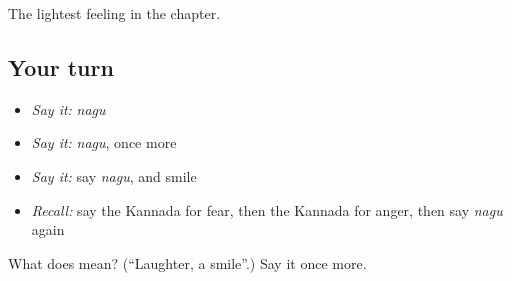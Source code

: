 \begin{grammarlens}[title={What you've built}]
The lightest feeling in the chapter.
\end{grammarlens}

\subsection*{Your turn}
\begin{itemize}
\raggedright
  \item \emph{Say it:} \emph{nagu}
  \item \emph{Say it:} \emph{nagu}, once more
  \item \emph{Say it:} say \emph{nagu}, and smile
  \item \emph{Recall:} say the Kannada for fear, then the Kannada for anger, then say \emph{nagu} again
\end{itemize}

\begin{tcolorbox}[breakable,colback=teal!4,colframe=teal!35!black,title={Before you move on}]
What does  mean? (\textquotedblleft{}Laughter, a smile\textquotedblright{}.) Say it once more.
\end{tcolorbox}
